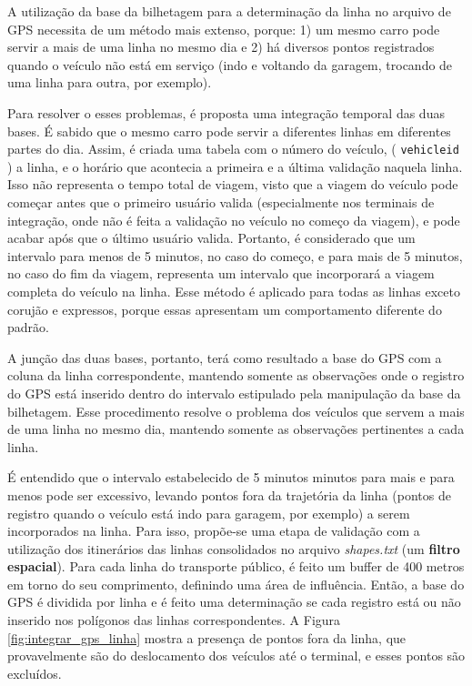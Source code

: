 \documentclass[        
    a4paper,          %
    12pt,             %
    chapter=TITLE,    %
    section=Title,    %
    subsection=Title, %
    oneside,          %
    english,          %
    spanish,          %
    brazil,           %
    fleqn             %
]{abntex2}
\let\oldtexttt\texttt
\renewcommand{\texttt}[1]{
  \colorbox{bgcolor}{\oldtexttt{#1}}
}
\begin{document}
  A utilização da base da bilhetagem para a determinação da linha no arquivo de GPS necessita de um método mais extenso, porque: 1) um mesmo carro pode servir a mais de uma linha no mesmo dia e 2) há diversos pontos registrados quando o veículo não está em serviço (indo e voltando da garagem, trocando de uma linha para outra, por exemplo).
  
  Para resolver o esses problemas, é proposta uma integração temporal das duas bases. É sabido que o mesmo carro pode servir a diferentes linhas em diferentes partes do dia. Assim, é criada uma tabela com o número do veículo, (\texttt{vehicleid}) a linha, e o horário que acontecia a primeira e a última validação naquela linha. Isso não representa o tempo total de viagem, visto que a viagem do veículo pode começar antes que o primeiro usuário valida (especialmente nos terminais de integração, onde não é feita a validação no veículo no começo da viagem), e pode acabar após que o último usuário valida. Portanto, é considerado que um intervalo para menos de 5 minutos, no caso do começo, e para mais de 5 minutos, no caso do fim da viagem, representa um intervalo que incorporará a viagem completa do veículo na linha. Esse método é aplicado para todas as linhas exceto corujão e expressos, porque essas apresentam um comportamento diferente do padrão.
  
  A junção das duas bases, portanto, terá como resultado a base do GPS com a coluna da linha correspondente, mantendo somente as observações onde o registro do GPS está inserido dentro do intervalo estipulado pela manipulação da base da bilhetagem. Esse procedimento resolve o problema dos veículos que servem a mais de uma linha no mesmo dia, mantendo somente as observações pertinentes a cada linha.
  
  É entendido que o intervalo estabelecido de 5 minutos minutos para mais e para menos pode ser excessivo, levando pontos fora da trajetória da linha (pontos de registro quando o veículo está indo para garagem, por exemplo) a serem incorporados na linha. Para isso, propõe-se uma etapa de validação com a utilização dos itinerários das linhas consolidados no arquivo \emph{shapes.txt} (um \textbf{filtro espacial}). Para cada linha do transporte público, é feito um buffer de 400 metros em torno do seu comprimento, definindo uma área de influência. Então, a base do GPS é dividida por linha e é feito uma determinação se cada registro está ou não inserido nos polígonos das linhas correspondentes. A Figura \ref{fig:integrar_gps_linha} mostra a presença de pontos fora da linha, que provavelmente são do deslocamento dos veículos até o terminal, e esses pontos são excluídos.
  
\end{document}
